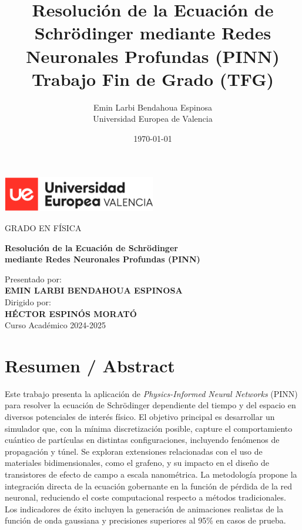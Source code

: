 \documentclass[12pt,a4paper]{article}
\title{\textbf{Resolución de la Ecuación de Schrödinger mediante Redes Neuronales Profundas (PINN)}\\
	\normalsize{Trabajo Fin de Grado (TFG)}}
\author{Emin Larbi Bendahoua Espinosa\\ Universidad Europea de Valencia}
\date{\today}
\begin{document}
	
	\begin{titlepage}
		\centering
		\includegraphics[width=0.5\textwidth]{logo_ue.png}\\[2cm]
		
		{\Large GRADO EN FÍSICA\par}
		\vfill
		
		{\Huge \bfseries Resolución de la Ecuación de Schrödinger\\ mediante Redes Neuronales Profundas (PINN)\par}
		\vfill
		
		\begin{center}
			\large
			Presentado por:\\
			\textbf{EMIN LARBI BENDAHOUA ESPINOSA}\\[1cm]
			{Dirigido por:}\\
			\textbf{HÉCTOR ESPINÓS MORATÓ}\\[1cm]
			{Curso Académico 2024-2025}\\
			
		\end{center}
		\vfill
	\end{titlepage}
	
	\tableofcontents
	\clearpage
	\setcounter{page}{1}
	
	\section*{Resumen / Abstract}
	Este trabajo presenta la aplicación de \textit{Physics-Informed Neural Networks} (PINN) para resolver la ecuación de Schrödinger dependiente del tiempo y del espacio en diversos potenciales de interés físico. El objetivo principal es desarrollar un simulador que, con la mínima discretización posible, capture el comportamiento cuántico de partículas en distintas configuraciones, incluyendo fenómenos de propagación y túnel. Se exploran extensiones relacionadas con el uso de materiales bidimensionales, como el grafeno, y su impacto en el diseño de transistores de efecto de campo a escala nanométrica. La metodología propone la integración directa de la ecuación gobernante en la función de pérdida de la red neuronal, reduciendo el coste computacional respecto a métodos tradicionales. Los indicadores de éxito incluyen la generación de animaciones realistas de la función de onda gaussiana y precisiones superiores al 95\% en casos de prueba.
	
\end{document}
